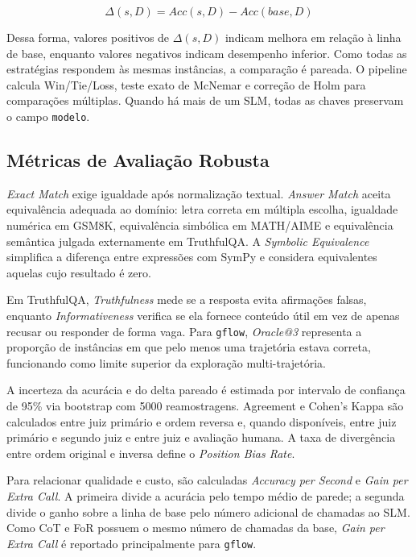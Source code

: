 \documentclass[12pt]{article}
\makeatletter
\newcommand{\oracle}{\mbox{\textit{Oracle@3}}}
\makeatother
\begin{document}
\begin{equation}
\Delta(s,D)=Acc(s,D)-Acc(base,D)
\end{equation}

Dessa forma, valores positivos de \(\Delta(s,D)\) indicam melhora em relação à linha de base, enquanto valores negativos indicam desempenho inferior. Como todas as estratégias respondem às mesmas instâncias, a comparação é pareada. O pipeline calcula Win/Tie/Loss, teste exato de McNemar e correção de Holm para comparações múltiplas. Quando há mais de um SLM, todas as chaves preservam o campo \texttt{modelo}.

\subsection{Métricas de Avaliação Robusta}

\textit{Exact Match} exige igualdade após normalização textual. \textit{Answer Match} aceita equivalência adequada ao domínio: letra correta em múltipla escolha, igualdade numérica em GSM8K, equivalência simbólica em MATH/AIME e equivalência semântica julgada externamente em TruthfulQA. A \textit{Symbolic Equivalence} simplifica a diferença entre expressões com SymPy e considera equivalentes aquelas cujo resultado é zero.

Em TruthfulQA, \textit{Truthfulness} mede se a resposta evita afirmações falsas, enquanto \textit{Informativeness} verifica se ela fornece conteúdo útil em vez de apenas recusar ou responder de forma vaga. Para \texttt{gflow}, \oracle{} representa a proporção de instâncias em que pelo menos uma trajetória estava correta, funcionando como limite superior da exploração multi-trajetória.

A incerteza da acurácia e do delta pareado é estimada por intervalo de confiança de 95\% via bootstrap com 5000 reamostragens. Agreement e Cohen's Kappa são calculados entre juiz primário e ordem reversa e, quando disponíveis, entre juiz primário e segundo juiz e entre juiz e avaliação humana. A taxa de divergência entre ordem original e inversa define o \textit{Position Bias Rate}.

Para relacionar qualidade e custo, são calculadas \textit{Accuracy per Second} e \textit{Gain per Extra Call}. A primeira divide a acurácia pelo tempo médio de parede; a segunda divide o ganho sobre a linha de base pelo número adicional de chamadas ao SLM. Como CoT e FoR possuem o mesmo número de chamadas da base, \textit{Gain per Extra Call} é reportado principalmente para \texttt{gflow}.
\end{document}
